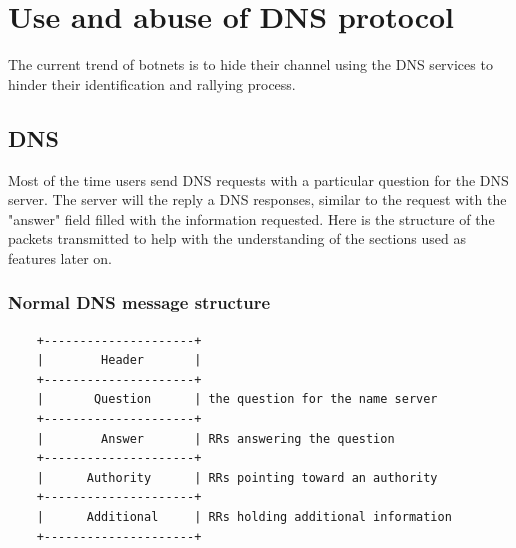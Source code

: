 \section{Use and abuse of DNS protocol}
The current trend of botnets is to hide their channel using the DNS services to hinder their identification and rallying process.\\

\subsection{DNS}


Most of the time users send DNS requests with a particular question for the DNS server. The server will the reply a DNS responses, similar to the request with the "answer" field filled with the information requested. Here is the structure of the packets transmitted to help with the understanding of the sections used as features later on.
\newpage
\subsubsection{Normal DNS message structure}
\begin{verbatim}
    +---------------------+
    |        Header       |
    +---------------------+
    |       Question      | the question for the name server
    +---------------------+
    |        Answer       | RRs answering the question
    +---------------------+
    |      Authority      | RRs pointing toward an authority
    +---------------------+
    |      Additional     | RRs holding additional information
    +---------------------+

\end{verbatim}

